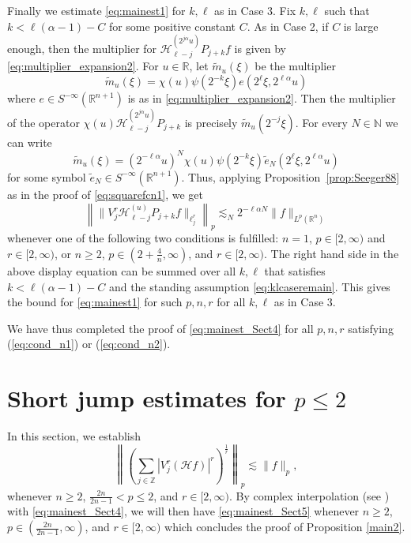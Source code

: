\documentclass[12pt,leqno]{amsart}
\def\R{\mathbb{R}}
\def\N{\mathbb{N}}
\def\Z{\mathbb{Z}}
\theoremstyle{plain}
\numberwithin{equation}{section}
\begin{document}
Finally we estimate \eqref{eq:mainest1} for $k, \ell$ as in Case 3. Fix $k, \ell$ such that $k < \ell (\alpha - 1) - C$ for some positive constant $C$. As in Case 2, if $C$ is large enough, then the multiplier for $\mathcal{H}^{(2^{j \alpha} u)}_{\ell-j} P_{j+k} f$ is given by \eqref{eq:multiplier_expansion2}. For $u \in \R$, let $\tilde{m}_u(\xi)$ be the multiplier  
\[
\tilde{m}_u(\xi) = \chi(u) \psi(2^{-k} \xi) e(2^{\ell} \xi, 2^{\ell \alpha} u)
\]
where $e \in S^{-\infty}(\R^{n+1})$ is as in \eqref{eq:multiplier_expansion2}. Then the multiplier of the operator $\chi(u) \mathcal{H}^{(2^{j \alpha} u)}_{\ell-j} P_{j+k}$ is precisely $\tilde{m}_u(2^{-j} \xi)$. For every $N \in \N$ we can write
\[
\tilde{m}_u(\xi) = (2^{-\ell \alpha} u)^N \chi(u) \psi(2^{-k} \xi) \tilde{e}_N(2^{\ell} \xi, 2^{\ell \alpha} u)
\]
for some symbol $\tilde{e}_N \in S^{-\infty}(\R^{n+1})$. Thus, applying Proposition~\ref{prop:Seeger88} as in the proof of \eqref{eq:squarefcn1}, we get
\[ 
\left\| \|V_j^{r} \mathcal{H}^{(u)}_{\ell-j} P_{j+k} f \|_{\ell^r_j} \right\|_p \lesssim_N 2^{-\ell \alpha N} \|f\|_{L^p(\R^n)}
\]
whenever one of the following two conditions is fulfilled: $n = 1$, $p \in [2,\infty)$ and $r \in [2,\infty)$, or $n \geq 2$, $p \in (2 + \frac{4}{n}, \infty)$, and $r \in [2,\infty)$. The right hand side in the above display equation can be summed over all $k, \ell$ that satisfies $k < \ell (\alpha -1) - C$ and the standing assumption \eqref{eq:klcaseremain}. This gives the bound for \eqref{eq:mainest1} for such $p, n, r$ for all $k, \ell$ as in Case 3.

We have thus completed the proof of \eqref{eq:mainest_Sect4} for all $p, n, r$ satisfying (\ref{eq:cond_n1}) or (\ref{eq:cond_n2}).


\section{Short jump estimates for $p\le 2$}\label{section:short-jump-small}

In this section, we establish 
\begin{equation} \label{eq:mainest_Sect5}
\left\| \left(\sum_{j\in \Z} |V_j^{r} (\mathcal{H}f)|^{r} \right)^{\frac{1}{r}}\right\|_p \lesssim \|f\|_p,
\end{equation}
whenever $n \geq 2$, $\frac{2n}{2n-1} < p \leq 2$, and $r \in [2, \infty)$. By complex interpolation (see \cite[Theorem 5.1.2]{BL76}) with \eqref{eq:mainest_Sect4}, we will then have \eqref{eq:mainest_Sect5} whenever $n \geq 2$, $p \in (\frac{2n}{2n-1}, \infty)$, and $r \in [2, \infty)$ which concludes the proof of Proposition \ref{main2}.
\end{document}
